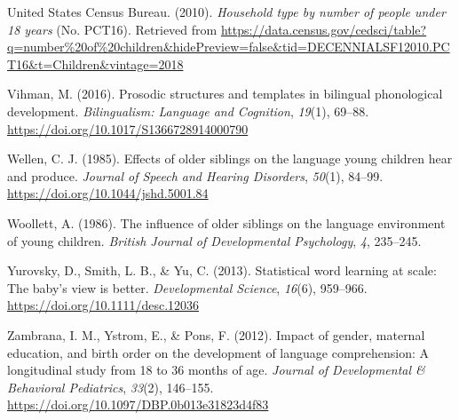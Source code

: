\documentclass[
  english,
  man,floatsintext]{apa6}
\begin{document}
\leavevmode\hypertarget{ref-united_states_census_bureau_household_2010}{}%
United States Census Bureau. (2010). \emph{Household type by number of people under 18 years} (No. PCT16). Retrieved from \url{https://data.census.gov/cedsci/table?q=number\%20of\%20children\&hidePreview=false\&tid=DECENNIALSF12010.PCT16\&t=Children\&vintage=2018}

\leavevmode\hypertarget{ref-vihman_prosodic_2016}{}%
Vihman, M. (2016). Prosodic structures and templates in bilingual phonological development. \emph{Bilingualism: Language and Cognition}, \emph{19}(1), 69--88. \url{https://doi.org/10.1017/S1366728914000790}

\leavevmode\hypertarget{ref-wellen_effects_1985}{}%
Wellen, C. J. (1985). Effects of older siblings on the language young children hear and produce. \emph{Journal of Speech and Hearing Disorders}, \emph{50}(1), 84--99. \url{https://doi.org/10.1044/jshd.5001.84}

\leavevmode\hypertarget{ref-woollett_influence_1986}{}%
Woollett, A. (1986). The influence of older siblings on the language environment of young children. \emph{British Journal of Developmental Psychology}, \emph{4}, 235--245.

\leavevmode\hypertarget{ref-yurovsky_statistical_2013}{}%
Yurovsky, D., Smith, L. B., \& Yu, C. (2013). Statistical word learning at scale: The baby's view is better. \emph{Developmental Science}, \emph{16}(6), 959--966. \url{https://doi.org/10.1111/desc.12036}

\leavevmode\hypertarget{ref-zambrana_impact_2012}{}%
Zambrana, I. M., Ystrom, E., \& Pons, F. (2012). Impact of gender, maternal education, and birth order on the development of language comprehension: A longitudinal study from 18 to 36 months of age. \emph{Journal of Developmental \& Behavioral Pediatrics}, \emph{33}(2), 146--155. \url{https://doi.org/10.1097/DBP.0b013e31823d4f83}

\endgroup
\end{document}

